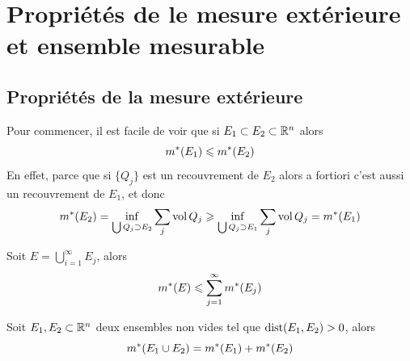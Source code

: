 \section{Propriétés de le mesure extérieure et ensemble mesurable}

\subsection{Propriétés de la mesure extérieure}
Pour commencer, il est facile de voir que si $E_1 \subset E_2 \subset \mathbb{R}^n$ alors
\[
m^* ( E_1 ) \leqslant m^* ( E_2 )
\]
En effet, parce que si $\{Q_j\}$ est un recouvrement de $E_2$ alors a fortiori c'est aussi un recouvrement de $E_1$, et donc 
\[
m^* ( E_2 ) = \inf_{\bigcup Q_j \supset E_2} \sum_j \operatorname{vol} Q_j \geqslant \inf_{\bigcup Q_j \supset E_1} \sum_j \operatorname{vol} Q_j = m^* ( E_1 )
\]

\begin{proposition} \label{prop: Sous-additivité dénombrable}
	Soit $E = \bigcup_{i=1}^\infty E_j$, alors
	\[
	m^* ( E ) \leqslant \sum_{j=1}^\infty m^* ( E_j )
	\]
\end{proposition}


\begin{theoreme}[Additivité 1] \label{thm: Additivité 1}
	Soit $E_1, E_2 \subset \mathbb{R}^n$ deux ensembles non vides tel que $\operatorname{dist}(E_1, E_2) > 0$, alors
	\[
	m^* ( E_1\cup E_2 ) = m^* ( E_1 ) + m^* ( E_2 )
	\]
\end{theoreme}

